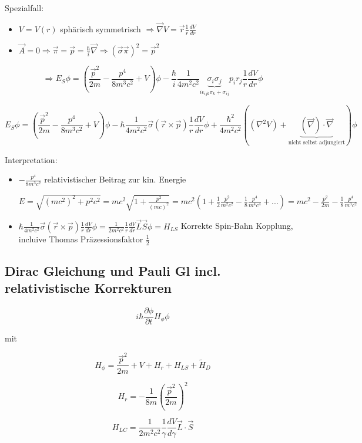 Spezialfall: 
\begin{itemize}
\item \(V=V(r)\) sphärisch symmetrisch \(\Rightarrow \vec\nabla V = \vec r \frac{1}{r}\frac{dV}{dr}\)
\item \(\vec A = 0 \Rightarrow \vec \pi = \vec p = \frac{\hbar}{i}\vec\nabla \Rightarrow (\vec\sigma \vec\pi)^2=\vec p^2\) 
\end{itemize}

\[\Rightarrow E_S\phi = ( \frac{\vec p^2}{2m} - \frac{p^4}{8m^3c^2}+V)\phi - \frac{\hbar}{i}\frac{1}{4m^2c^2}\underbrace{\sigma_i\sigma_j}_{i\epsilon_{ijk}\pi_k+\sigma_{ij}} p_ir_j\frac{1}{r}\frac{dV}{dr}\phi\]


\[E_S\phi = ( \frac{\vec p^2}{2m} - \frac{p^4}{8m^3c^2}+V)\phi - \hbar \frac{1}{4m^2c^2}\vec\sigma(\vec r\times\vec p)\frac{1}{r}\frac{dV}{dr}\phi + \frac{\hbar^2}{4m^2c^2}\left((\nabla^2 V)+\underbrace{(\vec\nabla)\cdot\vec\nabla}_{\text{nicht selbst adjungiert}}  \right)\phi\]


Interpretation:

\begin{itemize}
\item  \(- \frac{p^4}{8m^3c^2}\) relativistischer Beitrag zur kin. Energie

\(E = \sqrt{(mc^2)^2+p^2c^2} = mc^2\sqrt{1+\frac{p^2}{(mc)^2}}= mc^2(1+\frac{1}{2}\frac{p^2}{m^2c^2}-\frac{1}{8}\frac{p^4}{m^4c^4}+...) = mc^2-\frac{p^2}{2m}-\frac{1}{8}\frac{p^4}{m^3c^2}\)

\item \( \hbar \frac{1}{4m^2c^2}\vec\sigma(\vec r\times\vec p)\frac{1}{r}\frac{dV}{dr}\phi = \frac{1}{2m^2c^2}\frac{1}{r}\frac{dV}{dr}\vec L\vec S\phi = H_{LS} \) Korrekte Spin-Bahn Kopplung, incluive Thomas Präzessionsfaktor \(\frac{1}{2}\)
\end{itemize}


\subsection{Dirac Gleichung und Pauli Gl incl. relativistische Korrekturen}

\[i\hbar \frac{\partial \phi}{\partial t} H_\phi \phi\]


mit 

\[H_\phi = \frac{\vec p^2}{2m}+V+H_r+H_{LS}+\tilde H_D\]

\[H_r = -\frac{1}{8m}\left(\frac{\vec p^2}{2m}\right)^2\]

\[H_{LC} = \frac{1}{2m^2c^2}\frac{1}{\gamma}\frac{dV}{d\gamma}\vec L\cdot\vec S\]

